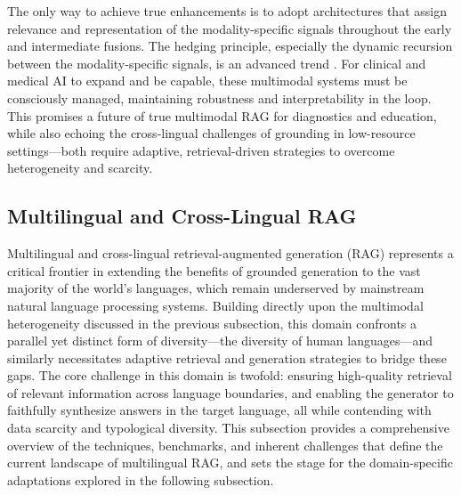 \documentclass[11pt]{article}
\begin{document}
The only way to achieve true enhancements is to adopt architectures that assign relevance and representation of the modality-specific signals throughout the early and intermediate fusions. The hedging principle, especially the dynamic recursion between the modality-specific signals, is an advanced trend \cite{ref366}. For clinical and medical AI to expand and be capable, these multimodal systems must be consciously managed, maintaining robustness and interpretability in the loop. This promises a future of true multimodal RAG for diagnostics and education, while also echoing the cross-lingual challenges of grounding in low-resource settings---both require adaptive, retrieval-driven strategies to overcome heterogeneity and scarcity.

\subsection{Multilingual and Cross-Lingual RAG}

Multilingual and cross-lingual retrieval-augmented generation (RAG) represents a critical frontier in extending the benefits of grounded generation to the vast majority of the world's languages, which remain underserved by mainstream natural language processing systems. Building directly upon the multimodal heterogeneity discussed in the previous subsection, this domain confronts a parallel yet distinct form of diversity---the diversity of human languages---and similarly necessitates adaptive retrieval and generation strategies to bridge these gaps. The core challenge in this domain is twofold: ensuring high-quality retrieval of relevant information across language boundaries, and enabling the generator to faithfully synthesize answers in the target language, all while contending with data scarcity and typological diversity. This subsection provides a comprehensive overview of the techniques, benchmarks, and inherent challenges that define the current landscape of multilingual RAG, and sets the stage for the domain-specific adaptations explored in the following subsection.
\end{document}
